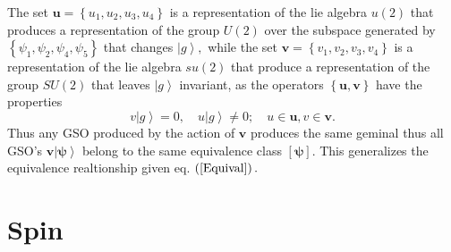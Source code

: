 \documentclass[aps,preprint]{revtex4}%
\begin{document}
The set $\bm{u}=\left\{  u_{1},u_{2},u_{3},u_{4}\right\}  $ is a
representation of the lie algebra $u\left(  2\right)  $ that produces a
representation of the group $U\left(  2\right)  $ over the subspace generated
by $\left\{  \psi_{1},\psi_{2},\psi_{4},\psi_{5}\right\}  $ that changes
$\left\vert g\right\rangle ,$ while the set $\bm{v}=\left\{  v_{1},v_{2}%
,v_{3},v_{4}\right\}  $ is a representation of the lie algebra $su\left(
2\right)  $ that produce a representation of the group $SU\left(  2\right)  $
that leaves $\left\vert g\right\rangle $ invariant, as the operators $\left\{
\bm{u,v}\right\}  $ have the properties
\begin{equation}
v\left\vert g\right\rangle =0,\quad u\left\vert g\right\rangle \neq0;\quad
u\in\bm{u},v\in\bm{v.}
\end{equation}
Thus any GSO produced by the action of $\bm{v}$ produces the same geminal thus
all GSO's $\bm{v}\left\vert \bm{\psi}\right\rangle $ belong to the same
equivalence class $\left[  \bm{\psi}\right]  .$ This generalizes the
equivalence realtionship given eq. $\left(  \ref{Equival}\right)  .$

\section{Spin\label{Spin}}
\end{document}
